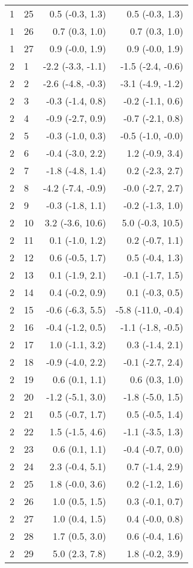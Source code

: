 \begin{tabular}{llrr}
     1 &   25 & 0.5 (-0.3, 1.3) & 0.5 (-0.3, 1.3) \\ 
     1 &   26 & 0.7 (0.3, 1.0) & 0.7 (0.3, 1.0) \\ 
     1 &   27 & 0.9 (-0.0, 1.9) & 0.9 (-0.0, 1.9) \\ 
     2 &    1 & -2.2 (-3.3, -1.1) & -1.5 (-2.4, -0.6) \\ 
     2 &    2 & -2.6 (-4.8, -0.3) & -3.1 (-4.9, -1.2) \\ 
     2 &    3 & -0.3 (-1.4, 0.8) & -0.2 (-1.1, 0.6) \\ 
     2 &    4 & -0.9 (-2.7, 0.9) & -0.7 (-2.1, 0.8) \\ 
     2 &    5 & -0.3 (-1.0, 0.3) & -0.5 (-1.0, -0.0) \\ 
     2 &    6 & -0.4 (-3.0, 2.2) & 1.2 (-0.9, 3.4) \\ 
     2 &    7 & -1.8 (-4.8, 1.4) & 0.2 (-2.3, 2.7) \\ 
     2 &    8 & -4.2 (-7.4, -0.9) & -0.0 (-2.7, 2.7) \\ 
     2 &    9 & -0.3 (-1.8, 1.1) & -0.2 (-1.3, 1.0) \\ 
     2 &   10 & 3.2 (-3.6, 10.6) & 5.0 (-0.3, 10.5) \\ 
     2 &   11 & 0.1 (-1.0, 1.2) & 0.2 (-0.7, 1.1) \\ 
     2 &   12 & 0.6 (-0.5, 1.7) & 0.5 (-0.4, 1.3) \\ 
     2 &   13 & 0.1 (-1.9, 2.1) & -0.1 (-1.7, 1.5) \\ 
     2 &   14 & 0.4 (-0.2, 0.9) & 0.1 (-0.3, 0.5) \\ 
     2 &   15 & -0.6 (-6.3, 5.5) & -5.8 (-11.0, -0.4) \\ 
     2 &   16 & -0.4 (-1.2, 0.5) & -1.1 (-1.8, -0.5) \\ 
     2 &   17 & 1.0 (-1.1, 3.2) & 0.3 (-1.4, 2.1) \\ 
     2 &   18 & -0.9 (-4.0, 2.2) & -0.1 (-2.7, 2.4) \\ 
     2 &   19 & 0.6 (0.1, 1.1) & 0.6 (0.3, 1.0) \\ 
     2 &   20 & -1.2 (-5.1, 3.0) & -1.8 (-5.0, 1.5) \\ 
     2 &   21 & 0.5 (-0.7, 1.7) & 0.5 (-0.5, 1.4) \\ 
     2 &   22 & 1.5 (-1.5, 4.6) & -1.1 (-3.5, 1.3) \\ 
     2 &   23 & 0.6 (0.1, 1.1) & -0.4 (-0.7, 0.0) \\ 
     2 &   24 & 2.3 (-0.4, 5.1) & 0.7 (-1.4, 2.9) \\ 
     2 &   25 & 1.8 (-0.0, 3.6) & 0.2 (-1.2, 1.6) \\ 
     2 &   26 & 1.0 (0.5, 1.5) & 0.3 (-0.1, 0.7) \\ 
     2 &   27 & 1.0 (0.4, 1.5) & 0.4 (-0.0, 0.8) \\ 
     2 &   28 & 1.7 (0.5, 3.0) & 0.6 (-0.4, 1.6) \\ 
     2 &   29 & 5.0 (2.3, 7.8) & 1.8 (-0.2, 3.9) \\ 
   \hline
\end{tabular}

